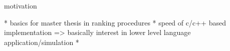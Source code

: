 motivation

* basics for master thesis in ranking procedures
* speed of c/c++ based implementation => basically interest in lower level language application/simulation
*